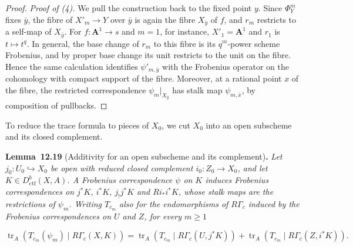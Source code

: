 \documentclass[11pt]{article}
\newenvironment{bpstatement}[2]{\par\addvspace{0.6\baselineskip}\noindent\textbf{#1}#2\textbf{.}\enspace\ignorespaces}
  {\par\addvspace{0.4\baselineskip}}
\newenvironment{bpstatementit}[2]{\begin{bpstatement}{#1}{#2}\itshape\ignorespaces}{\end{bpstatement}}
\begin{document}
\begin{proof}[{Proof}]
\emph{Proof of (4).} We pull the construction back to the fixed point \(y\). Since \(\Phi_Y^m\) fixes \(\bar y\), the fibre of \(X'_m\to Y\) over \(\bar y\) is again the fibre \(X_{\bar y}\) of \(f\), and \(r_m\) restricts to a self-map of \(X_{\bar y}\). For \(f:\mathbf A^1\to s\) and \(m=1\), for instance, \(X'_1=\mathbf A^1\) and \(r_1\) is \(t\mapsto t^q\). In general, the base change of \(r_m\) to this fibre is its \(q^m\)-power scheme Frobenius, and by proper base change its unit restricts to the unit on the fibre. Hence the same calculation identifies \(\psi'_{m,\bar y}\) with the Frobenius operator on the cohomology with compact support of the fibre. Moreover, at a rational point \(x\) of the fibre, the restricted correspondence \(\psi_m|_{X_{\bar y}}\) has stalk map \(\psi_{m,\bar x}\), by composition of pullbacks.
\end{proof}

\label{bp282}%
To reduce the trace formula to pieces of \(X_0\), we cut \(X_0\) into an open subscheme and its closed complement.

\label{bp283}%
\begin{bpstatementit}{Lemma~12.19}{ (Additivity for an open subscheme and its complement)}
Let \(j_0:U_0\hookrightarrow X_0\) be open with reduced closed complement \(i_0:Z_0\to X_0\), and let \(K\in D^b_{\mathrm{ctf}}(X,A)\). A Frobenius correspondence \(\psi\) on \(K\) induces Frobenius correspondences on \(j^*K\), \(i^*K\), \(j_!j^*K\) and \(Ri_*i^*K\), whose stalk maps are the restrictions of \(\psi_m\). Writing \(T_{c_m}\) also for the endomorphisms of \(R\Gamma_c\) induced by the Frobenius correspondences on \(U\) and \(Z\), for every \(m\geq1\)

\[
\operatorname{tr}_A(T_{c_m}(\psi_m)\mid R\Gamma_c(X,K))
=\operatorname{tr}_A(T_{c_m}\mid R\Gamma_c(U,j^*K))
+\operatorname{tr}_A(T_{c_m}\mid R\Gamma_c(Z,i^*K)).
\]
\end{bpstatementit}
\end{document}
